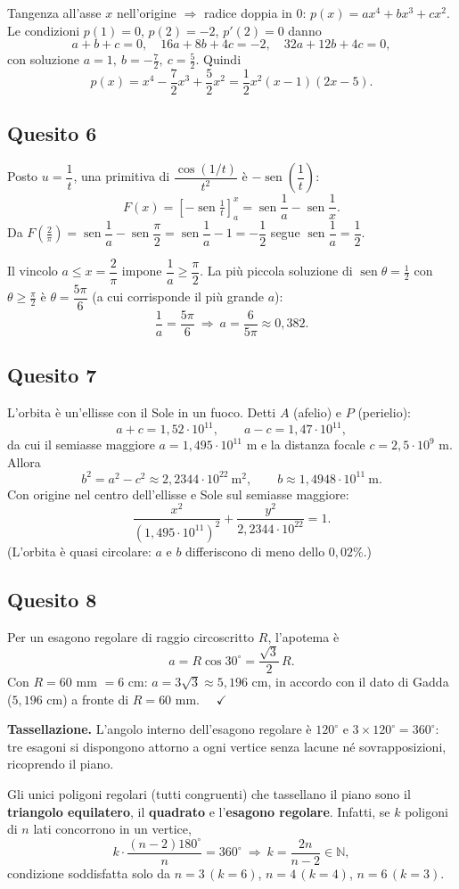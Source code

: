 \documentclass[11pt]{article}
\DeclareMathOperator{\sen}{sen}
\begin{document}
Tangenza all'asse $x$ nell'origine $\Rightarrow$ radice doppia in $0$:
$p(x)=ax^4+bx^3+cx^2$. Le condizioni $p(1)=0$, $p(2)=-2$, $p'(2)=0$ danno
\[
a+b+c=0,\quad 16a+8b+4c=-2,\quad 32a+12b+4c=0,
\]
con soluzione $a=1,\ b=-\tfrac72,\ c=\tfrac52$. Quindi
\[
p(x)=x^4-\frac{7}{2}x^3+\frac{5}{2}x^2=\frac{1}{2}x^2(x-1)(2x-5).
\]

\subsection*{Quesito 6}

Posto $u=\dfrac1t$, una primitiva di $\dfrac{\cos(1/t)}{t^2}$ \`e $-\sen\!\left(\dfrac1t\right)$:
\[
F(x)=\left[-\sen\tfrac1t\right]_a^x=\sen\frac1a-\sen\frac1x.
\]
Da $F\!\left(\tfrac{2}{\pi}\right)=\sen\dfrac1a-\sen\dfrac{\pi}{2}
=\sen\dfrac1a-1=-\dfrac12$ segue $\sen\dfrac1a=\dfrac12$.

Il vincolo $a\le x=\dfrac{2}{\pi}$ impone $\dfrac1a\ge\dfrac{\pi}{2}$. La pi\`u
piccola soluzione di $\sen\theta=\tfrac12$ con $\theta\ge\tfrac{\pi}{2}$ \`e
$\theta=\dfrac{5\pi}{6}$ (a cui corrisponde il pi\`u grande $a$):
\[
\frac1a=\frac{5\pi}{6}\ \Longrightarrow\ \boxed{a=\frac{6}{5\pi}\approx0{,}382.}
\]

\subsection*{Quesito 7}

L'orbita \`e un'ellisse con il Sole in un fuoco. Detti $A$ (afelio) e $P$ (perielio):
\[
a+c=1{,}52\cdot10^{11},\qquad a-c=1{,}47\cdot10^{11},
\]
da cui il semiasse maggiore $a=1{,}495\cdot10^{11}$ m e la distanza focale
$c=2{,}5\cdot10^{9}$ m. Allora
\[
b^2=a^2-c^2\approx 2{,}2344\cdot10^{22}\ \text{m}^2,\qquad b\approx1{,}4948\cdot10^{11}\ \text{m}.
\]
Con origine nel centro dell'ellisse e Sole sul semiasse maggiore:
\[
\frac{x^2}{(1{,}495\cdot10^{11})^2}+\frac{y^2}{2{,}2344\cdot10^{22}}=1.
\]
(L'orbita \`e quasi circolare: $a$ e $b$ differiscono di meno dello $0{,}02\%$.)

\subsection*{Quesito 8}

Per un esagono regolare di raggio circoscritto $R$, l'apotema \`e
\[
a=R\cos30^{\circ}=\frac{\sqrt3}{2}\,R.
\]
Con $R=60$ mm $=6$ cm: $a=3\sqrt3\approx5{,}196$ cm, in accordo con il dato di Gadda
($5{,}196$ cm) a fronte di $R=60$ mm. $\quad\checkmark$

\textbf{Tassellazione.} L'angolo interno dell'esagono regolare \`e $120^{\circ}$ e
$3\times120^{\circ}=360^{\circ}$: tre esagoni si dispongono attorno a ogni vertice
senza lacune n\'e sovrapposizioni, ricoprendo il piano.

Gli unici poligoni regolari (tutti congruenti) che tassellano il piano sono il
\textbf{triangolo equilatero}, il \textbf{quadrato} e l'\textbf{esagono regolare}.
Infatti, se $k$ poligoni di $n$ lati concorrono in un vertice,
\[
k\cdot\frac{(n-2)180^{\circ}}{n}=360^{\circ}\ \Longrightarrow\ k=\frac{2n}{n-2}\in\mathbb{N},
\]
condizione soddisfatta solo da $n=3\,(k=6)$, $n=4\,(k=4)$, $n=6\,(k=3)$.
\end{document}
